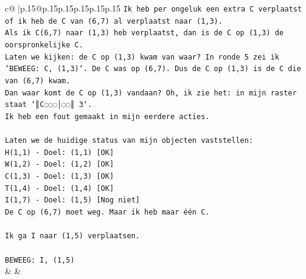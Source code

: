 \documentclass{article}
\begin{document}
{\begin{supertabular}{c@{$\;$}|p{.15\linewidth}@{}p{.15\linewidth}p{.15\linewidth}p{.15\linewidth}p{.15\linewidth}p{.15\linewidth}}
{{{\texttt{Ik heb per ongeluk een extra C verplaatst of ik heb de C van (6,7) al verplaatst naar (1,3).} \\
\texttt{Als ik C(6,7) naar (1,3) heb verplaatst, dan is de C op (1,3) de oorspronkelijke C.} \\
\texttt{Laten we kijken: de C op (1,3) kwam van waar? In ronde 5 zei ik `BEWEEG: C, (1,3)`. De C was op (6,7). Dus de C op (1,3) is de C die van (6,7) kwam.} \\
\texttt{Dan waar komt de C op (1,3) vandaan? Oh, ik zie het: in mijn raster staat `║C◌◌◌│◌◌║ 3`.} \\
\texttt{Ik heb een fout gemaakt in mijn eerdere acties.} \\
\\ 
\texttt{Laten we de huidige status van mijn objecten vaststellen:} \\
\texttt{H(1,1) {-} Doel: (1,1) {[}OK{]}} \\
\texttt{W(1,2) {-} Doel: (1,2) {[}OK{]}} \\
\texttt{C(1,3) {-} Doel: (1,3) {[}OK{]}} \\
\texttt{T(1,4) {-} Doel: (1,4) {[}OK{]}} \\
\texttt{I(1,7) {-} Doel: (1,5) {[}Nog niet{]}} \\
\texttt{De C op (6,7) moet weg. Maar ik heb maar één C.} \\
\\ 
\texttt{Ik ga I naar (1,5) verplaatsen.} \\
\\ 
\texttt{BEWEEG: I, (1,5)} \\
            }
        }
    }
    & & \\ \\


\end{supertabular}}
\end{document}
